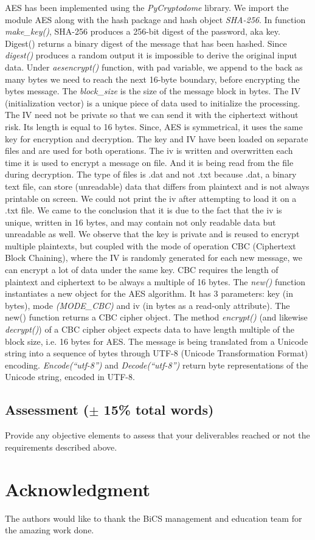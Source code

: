 AES has been implemented using the \textit{PyCryptodome} library. We import the module AES along with the hash package and hash object \textit{SHA-256}. In function \textit{make\_key()}, SHA-256 produces a 256-bit digest of the password, aka key. Digest() returns a binary digest of the message that has been hashed. Since \textit{digest()} produces a random output it is impossible to derive the original input data. Under \textit{aesencrypt()} function, with pad variable, we append to the back as many bytes we need to reach the next 16-byte boundary, before encrypting the bytes message. The \textit{block\_size} is the size of the message block in bytes. The IV (initialization vector) is a unique piece of data used to initialize the processing. The IV need not be private so that we can send it with the ciphertext without risk. Its length is equal to 16 bytes. Since, AES is symmetrical, it uses the same key for encryption and decryption. The key and IV have been loaded on separate files and are used for both operations. The iv is written and overwritten each time it is used to encrypt a message on file. And it is being read from the file during decryption. The type of files is .dat and not .txt because .dat, a binary text file, can store (unreadable) data that differs from plaintext and is not always printable on screen. We could not print the iv after attempting to load it on a .txt file. We came to the conclusion that it is due to the fact that the iv is unique, written in 16 bytes, and may contain not only readable data but unreadable as well. We observe that the key is private and is reused to encrypt multiple plaintexts, but coupled with the mode of operation CBC (Ciphertext Block Chaining), where the IV is randomly generated for each new message, we can encrypt a lot of data under the same key. CBC requires the length of plaintext and ciphertext to be always a multiple of 16 bytes. The \textit{new()} function instantiates a new object for the AES algorithm. It has 3 parameters: key (in bytes), mode \textit{(MODE\_CBC)} and iv (in bytes as a read-only attribute). The new() function returns a CBC cipher object. The method \textit{encrypt()} (and likewise \textit{decrypt()}) of a CBC cipher object expects data to have length multiple of the block size, i.e. 16 bytes for AES. The message is being translated from a Unicode string into a sequence of bytes through UTF-8 (Unicode Transformation Format) encoding. \textit{Encode(“utf-8”)} and \textit{Decode(“utf-8”)} return byte representations of the Unicode string, encoded in UTF-8.

\subsection{Assessment ($\pm$ 15\% total words)}
Provide any objective elements to assess that your deliverables reached or not the requirements described above. 
\section*{Acknowledgment}
The authors would like to thank the BiCS management and education team for the amazing work done.